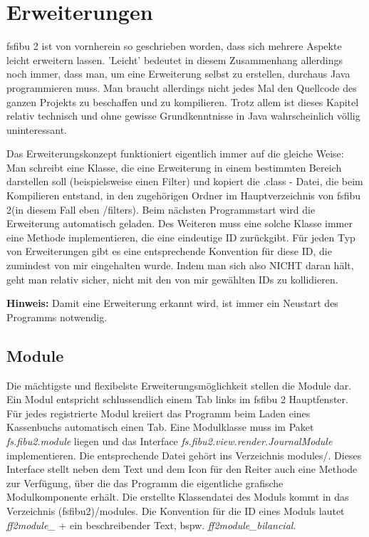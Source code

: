 \documentclass[a4paper,10pt,halfparskip,oneside,smallheadings]{scrbook}
\begin{document}
\chapter{Erweiterungen}

fsfibu 2 ist von vornherein so geschrieben worden, dass sich mehrere Aspekte leicht erweitern lassen. 'Leicht' bedeutet in diesem Zusammenhang allerdings noch immer, dass man, um eine Erweiterung selbst zu erstellen, durchaus Java programmieren muss. Man braucht allerdings nicht jedes Mal den Quellcode des ganzen Projekts zu beschaffen und zu kompilieren. Trotz allem ist dieses Kapitel relativ technisch und ohne gewisse Grundkenntnisse in Java wahrscheinlich völlig uninteressant.

Das Erweiterungskonzept funktioniert eigentlich immer auf die gleiche Weise: Man schreibt eine Klasse, die eine Erweiterung in einem bestimmten Bereich darstellen soll (beispielsweise einen Filter) und kopiert die .class - Datei, die beim Kompilieren entstand, in den zugehörigen Ordner im Hauptverzeichnis von fsfibu 2(in diesem Fall eben /filters). Beim nächsten Programmstart wird die Erweiterung automatisch geladen. Des Weiteren muss eine solche Klasse immer eine Methode implementieren, die eine eindeutige ID zurückgibt. Für jeden Typ von Erweiterungen gibt es eine entsprechende Konvention für diese ID, die zumindest von mir eingehalten wurde. Indem man sich also NICHT daran hält, geht man relativ sicher, nicht mit den von mir gewählten IDs zu kollidieren.

\textbf{Hinweis:} Damit eine Erweiterung erkannt wird, ist immer ein Neustart des Programms notwendig.

\section{Module}
Die mächtigste und flexibelste Erweiterungsmöglichkeit stellen die Module dar. Ein Modul entspricht schlussendlich einem Tab links im fsfibu 2 Hauptfenster. Für jedes registrierte Modul kreiiert das Programm beim Laden eines Kassenbuchs automatisch einen Tab. Eine Modulklasse muss im Paket \textit{fs.fibu2.module} liegen und das Interface \textit{fs.fibu2.view.render.JournalModule} implementieren. Die entsprechende Datei gehört ins Verzeichnis modules/. Dieses Interface stellt neben dem Text und dem Icon für den Reiter auch eine Methode zur Verfügung, über die das Programm die eigentliche grafische Modulkomponente erhält. Die erstellte Klassendatei des Moduls kommt in das Verzeichnis (fsfibu2)/modules. Die Konvention für die ID eines Moduls lautet \textit{ff2module\_} + ein beschreibender Text, bspw. \textit{ff2module\_bilancial}.
\end{document}

